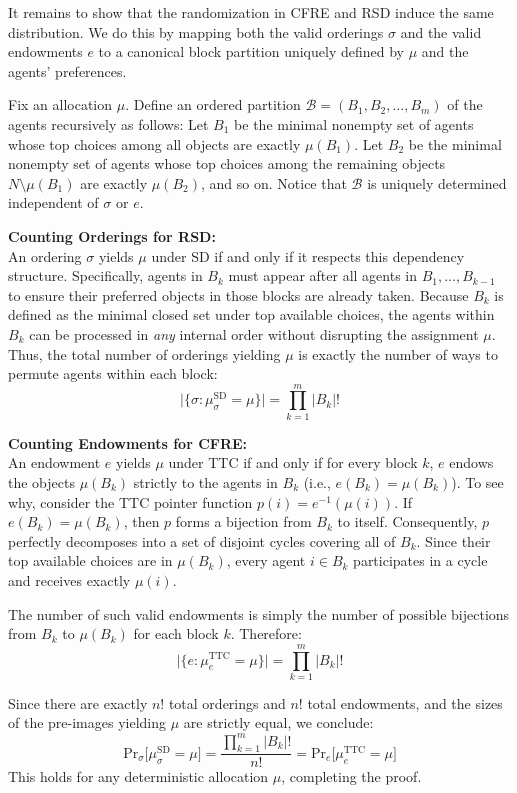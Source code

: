 {  It remains to show that the randomization in CFRE and RSD induce
  the same distribution. We do this by mapping both the valid orderings 
  $\sigma$ and the valid endowments $e$ to a canonical block partition 
  uniquely defined by $\mu$ and the agents' preferences.

  Fix an allocation $\mu$. Define an ordered partition $\mathcal{B} = (B_1, B_2, \ldots, B_m)$ 
  of the agents recursively as follows: Let $B_1$ be the minimal nonempty 
  set of agents whose top choices among all objects are exactly $\mu(B_1)$. 
  Let $B_2$ be the minimal nonempty set of agents whose top choices among 
  the remaining objects $N \setminus \mu(B_1)$ are exactly $\mu(B_2)$, and so on. 
  Notice that $\mathcal{B}$ is uniquely determined independent of $\sigma$ or $e$.

  \medskip
  \noindent \textbf{Counting Orderings for RSD:} \\
  An ordering $\sigma$ yields $\mu$ under SD if and only if it respects this 
  dependency structure. Specifically, agents in $B_k$ must appear after all 
  agents in $B_1, \ldots, B_{k-1}$ to ensure their preferred objects in those 
  blocks are already taken. Because $B_k$ is defined as the minimal closed set 
  under top available choices, the agents within $B_k$ can be processed in 
  \emph{any} internal order without disrupting the assignment $\mu$. 
  Thus, the total number of orderings yielding $\mu$ is exactly the number of 
  ways to permute agents within each block:
  \[
    \bigl|\{ \sigma : \mu^{\mathrm{SD}}_\sigma = \mu \}\bigr| = \prod_{k=1}^m |B_k|!
  \]

  \medskip
  \noindent \textbf{Counting Endowments for CFRE:} \\
  An endowment $e$ yields $\mu$ under TTC if and only if for every block $k$, 
  $e$ endows the objects $\mu(B_k)$ strictly to the agents in $B_k$ 
  (i.e., $e(B_k) = \mu(B_k)$). To see why, consider the TTC pointer function 
  $p(i) = e^{-1}(\mu(i))$. If $e(B_k) = \mu(B_k)$, then $p$ forms a bijection 
  from $B_k$ to itself. Consequently, $p$ perfectly decomposes into a set of 
  disjoint cycles covering all of $B_k$. Since their top available choices 
  are in $\mu(B_k)$, every agent $i \in B_k$ participates in a cycle and 
  receives exactly $\mu(i)$.
  
  The number of such valid endowments is simply the number of possible bijections 
  from $B_k$ to $\mu(B_k)$ for each block $k$. Therefore:
  \[
    \bigl|\{ e : \mu^{\mathrm{TTC}}_e = \mu \}\bigr| = \prod_{k=1}^m |B_k|!
  \]

  \medskip
  Since there are exactly $n!$ total orderings and $n!$ total endowments, 
  and the sizes of the pre-images yielding $\mu$ are strictly equal, we conclude:
  \[
    \text{Pr}_{\sigma}\!\bigl[\mu^{\mathrm{SD}}_\sigma = \mu\bigr] 
    = \frac{\prod_{k=1}^m |B_k|!}{n!} 
    = \text{Pr}_{e}\!\bigl[\mu^{\mathrm{TTC}}_e = \mu\bigr]
  \]
  This holds for any deterministic allocation $\mu$, completing the proof.
}

